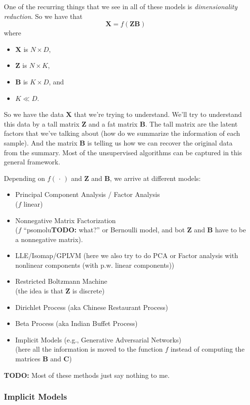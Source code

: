\documentclass[a2paper,8pt]{extarticle}
\newcommand{\mat}[1]{\mathbf{#1}}
\newcommand{\MB}{\mat{B}}
\newcommand{\MC}{\mat{C}}
\newcommand{\MX}{\mat{X}}
\newcommand{\MZ}{\mat{Z}}
\newcommand{\argdot}{\,\cdot\,}
\newcommand{\todo}[1]{\textbf{TODO:} #1}
\newcommand{\todo}[1]{%
}
\begin{document}
\begin{landscape}
\begin{multicols*}{7}
One of the recurring things that we see in all of these models is
\emph{dimensionality reduction}. So we have that
\[
\MX=f(\MZ\MB)
\]
where
\begin{itemize}
  \item $\MX$ is $N\times D$,
  \item $\MZ$ is $N\times K$,
  \item $\MB$ is $K\times D$, and
  \item $K\ll D$.
\end{itemize}
So we have the data $\MX$ that we're trying to understand. We'll try to
understand this data by a tall matrix $\MZ$ and a fat matrix $\MB$. The tall
matrix are the latent factors that we've talking about (how do we summarize the
information of each sample). And the matrix $\MB$ is telling us how we can
recover the original data from the summary. Most of the unsupervised algorithms
can be captured in this general framework.

Depending on $f(\argdot)$ and $\MZ$ and $\MB$, we arrive at different models:
\begin{itemize}
  \item Principal Component Analysis / Factor Analysis \\($f$ linear)
  \item Nonnegative Matrix Factorization\\ ($f$ ``psomolu\todo{what?}'' or
  Bernoulli model, and bot $\MZ$ and $\MB$ have to be a nonnegative matrix).
  \item LLE/Isomap/GPLVM (here we also try to do PCA or Factor analysis with
  nonlinear components (with p.w. linear components))
  \item Restricted Boltzmann Machine \\(the idea is that $\MZ$ is discrete)
  \item Dirichlet Process (aka Chinese Restaurant Process)\\
  \item Beta Process (aka Indian Buffet Process)
  \item Implicit Models (e.g., Generative Adversarial Networks)\\
  (here all the information is moved to the function $f$ instead of computing
  the matrices $\MB$ and $\MC$)
\end{itemize}

\todo{Most of these methods just say nothing to me.}

\subsubsection{Implicit Models}


\end{multicols*}
\end{landscape}
\end{document}
